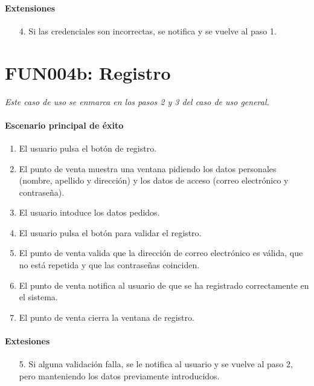   \paragraph{Extensiones}
  \begin{enumerate}
    \item[4.] Si las credenciales son incorrectas, se notifica y se vuelve al paso 1.
  \end{enumerate}

\section{FUN004b: Registro}
  \emph{Este caso de uso se enmarca en los pasos 2 y 3 del caso de uso general.}
  \paragraph{Escenario principal de éxito}
  \begin{enumerate}
    \item El usuario pulsa el botón de registro.
    \item El punto de venta muestra una ventana pidiendo los datos personales (nombre, apellido y dirección) y los datos de acceso (correo electrónico y contraseña).
    \item El usuario intoduce los datos pedidos.
    \item El usuario pulsa el botón para validar el registro.
    \item El punto de venta valida que la dirección de correo electrónico es válida, que no está repetida y que las contraseñas coinciden.
    \item El punto de venta notifica al usuario de que se ha registrado correctamente en el sistema.
    \item El punto de venta cierra la ventana de registro.
  \end{enumerate}
  \paragraph{Extesiones}
  \begin{enumerate}
     \item[5.] Si alguna validación falla, se le notifica al usuario y se vuelve al paso 2, pero manteniendo los datos previamente introducidos.
  \end{enumerate}